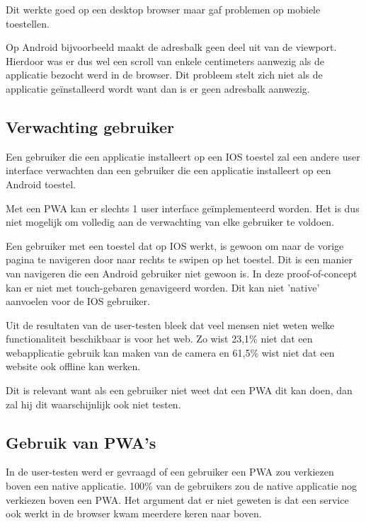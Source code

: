 			Dit werkte goed op een desktop browser maar gaf problemen op mobiele toestellen.
			
			Op Android bijvoorbeeld maakt de adresbalk geen deel uit van de viewport. Hierdoor was er dus wel een scroll van enkele centimeters aanwezig als de applicatie bezocht werd in de browser. Dit probleem stelt zich niet als de applicatie geïnstalleerd wordt want dan is er geen adresbalk aanwezig.
			
	\subsection{Verwachting gebruiker}
		Een gebruiker die een applicatie installeert op een IOS toestel zal een andere user interface verwachten dan een gebruiker die een applicatie installeert op een Android toestel.
		
		Met een PWA kan er slechts 1 user interface geïmplementeerd worden. Het is dus niet mogelijk om volledig aan de verwachting van elke gebruiker te voldoen.
		
		Een gebruiker met een toestel dat op IOS werkt, is gewoon om naar de vorige pagina te navigeren door naar rechts te swipen op het toestel. Dit is een manier van navigeren die een Android gebruiker niet gewoon is. In deze proof-of-concept kan er niet met touch-gebaren genavigeerd worden. Dit kan niet 'native' aanvoelen voor de IOS gebruiker. 
		
		Uit de resultaten van de user-testen bleek dat veel mensen niet weten welke functionaliteit beschikbaar is voor het web. Zo wist 23,1\% niet dat een webapplicatie gebruik kan maken van de camera en 61,5\% wist niet dat een website ook offline kan werken.
		
		Dit is relevant want als een gebruiker niet weet dat een PWA dit kan doen, dan zal hij dit waarschijnlijk ook niet testen. 
		
	\subsection{Gebruik van PWA's}
		In de user-testen werd er gevraagd of een gebruiker een PWA zou verkiezen boven een native applicatie. 
		100\% van de gebruikers zou de native applicatie nog verkiezen boven een PWA. Het argument dat er niet geweten is dat een service ook werkt in de browser kwam meerdere keren naar boven.
		
